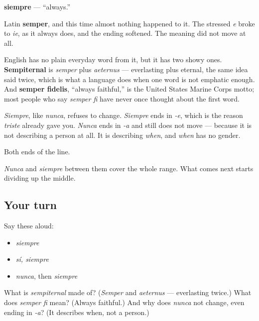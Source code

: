 \begin{cousinweb}
\textbf{siempre} — \textquotedblleft{}always.\textquotedblright{}

Latin \textbf{semper}, and this time almost nothing happened to it. The stressed \emph{e} broke to \emph{ie}, as it always does, and the ending softened. The meaning did not move at all.

English has no plain everyday word from it, but it has two showy ones. \textbf{Sempiternal} is \emph{semper} plus \emph{aeternus} — everlasting plus eternal, the same idea said twice, which is what a language does when one word is not emphatic enough. And \textbf{semper fidelis}, \textquotedblleft{}always faithful,\textquotedblright{} is the United States Marine Corps motto; most people who say \emph{semper fi} have never once thought about the first word.

\emph{Siempre}, like \emph{nunca}, refuses to change. \emph{Siempre} ends in \emph{-e}, which is the reason \emph{triste} already gave you. \emph{Nunca} ends in \emph{-a} and still does not move — because it is not describing a person at all. It is describing \emph{when}, and \emph{when} has no gender.
\end{cousinweb}

\begin{grammarlens}[title={What you've built}]
Both ends of the line.

\emph{Nunca} and \emph{siempre} between them cover the whole range. What comes next starts dividing up the middle.
\end{grammarlens}

\subsection*{Your turn}
Say these aloud:

\begin{itemize}
\raggedright
  \item \emph{siempre}
  \item \emph{sí, siempre}
  \item \emph{nunca}, then \emph{siempre}
\end{itemize}

\begin{tcolorbox}[breakable,colback=teal!4,colframe=teal!35!black,title={Before you move on}]
What is \emph{sempiternal} made of? (\emph{Semper} and \emph{aeternus} — everlasting twice.) What does \emph{semper fi} mean? (Always faithful.) And why does \emph{nunca} not change, even ending in \emph{-a}? (It describes when, not a person.)
\end{tcolorbox}
